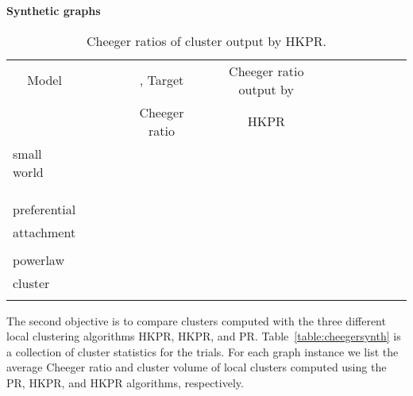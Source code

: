 \documentclass[runningheads,a4paper]{llncs}
\begin{document}
\begin{table}
\centering
\textbf{Synthetic graphs}\\
\begin{tabular}{|p{2.6cm}|c|c|c|c|}
\hline
\multicolumn{1}{|c|}{Model} & ~~~~  & , Target & Cheeger ratio output by &
~~~~~~~~~~\\
             &            & Cheeger ratio & HKPR          & \\
\hline\hline
small world  &    &  &  & \\
             &    &  &  & \\
             &    &  &  & \\
             &   &  &  & \\\hline
preferential &    &  &  & \\
attachment   &    &  &  & \\
             &    &  &  & \\\hline
powerlaw     &    &  &  & \\
cluster      &    &  &  & \\
             &    &  &  & \\
\hline 
\end{tabular}
\caption{Cheeger ratios of cluster output by HKPR.}
\label{table:synthhkprclusterresults}
\end{table}

The second objective is to compare clusters computed with the three different
local clustering algorithms HKPR, HKPR, and PR.
Table~\ref{table:cheegersynth} is a collection of cluster statistics for the
trials.  For each graph instance we list the average Cheeger ratio and cluster
volume of local clusters computed using the PR, HKPR, and HKPR
algorithms, respectively.  
\end{document}
